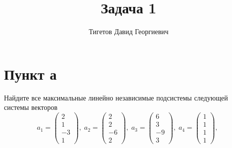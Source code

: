 \documentclass[12pt]{article}
\begin{document}
    \title{Задача 1}
    \author{Тигетов Давид Георгиевич}
    \date{}
    \maketitle

    \section*{Пункт а}
    Найдите все максимальные линейно независимые подсистемы следующей системы векторов
    \[
        a_1 = \begin{pmatrix}
                  2 \\ 1 \\ -3 \\ 1
        \end{pmatrix}, \;
        a_2 = \begin{pmatrix}
                  2 \\ 2 \\ -6 \\ 2
        \end{pmatrix}, \;
        a_3 = \begin{pmatrix}
                  6 \\ 3 \\ -9 \\ 3
        \end{pmatrix}, \;
        a_4 = \begin{pmatrix}
                  1 \\ 1 \\ 1 \\ 1
        \end{pmatrix}, \;
    \]
\end{document}

